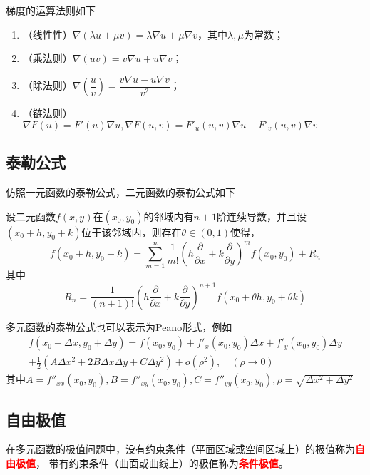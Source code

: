 梯度的运算法则如下
\begin{enumerate}[(1)]
    \item （线性性）$\nabla (\lambda u + \mu v) = \lambda \nabla u + \mu \nabla v$，其中$\lambda,\mu$为常数；
    \item （乘法则）$\nabla(uv) = v\nabla u + u\nabla v$；
    \item （除法则）$\nabla\left(\dfrac{u}{v}\right) = \dfrac{v\nabla u - u\nabla v}{v^2}$；
    \item （链法则）$\nabla F(u) = F'(u)\nabla u, \nabla F(u,v) = F'_u(u,v)\nabla u + F'_v(u,v)\nabla v$
\end{enumerate}

\subsection{泰勒公式}
仿照一元函数的泰勒公式，二元函数的泰勒公式如下
\begin{theorem}
    设二元函数$f(x,y)$在$(x_0,y_0)$的邻域内有$n+1$阶连续导数，并且设$(x_0+h,y_0+k)$位于该邻域内，则存在$\theta\in(0,1)$使得，
    \[
        f(x_0+h,y_0+k) = \sum_{m=1}^n \frac{1}{m!}\left(h\frac{\partial}{\partial x} + k\frac{\partial}{\partial y}\right)^mf(x_0,y_0) + R_n
    \]
    其中
    \[
        R_n = \frac{1}{(n+1)!}\left(h\frac{\partial}{\partial x}+k\frac{\partial}{\partial y}\right)^{n+1}f(x_0+\theta h,y_0 +\theta k)
    \]

    多元函数的泰勒公式也可以表示为Peano形式，例如
    \begin{equation}
        \begin{split}
            f(x_0+\Delta x, y_0 + \Delta y) = f(x_0,y_0) + f'_x(x_0,y_0)\Delta x + f'_y(x_0,y_0)\Delta y \\
            + \frac{1}{2}\left(A\Delta x^2 + 2B\Delta x\Delta y + C\Delta y^2\right) + o(\rho^2),\quad (\rho\to 0)
        \end{split}
    \end{equation}
    其中$A=f''_{xx}(x_0,y_0),B=f''_{xy}(x_0,y_0),C=f''_{yy}(x_0,y_0),\rho=\sqrt{\Delta x^2 + \Delta y^2}$
\end{theorem}

\subsection{自由极值}
在多元函数的极值问题中，没有约束条件（平面区域或空间区域上）的极值称为\textcolor{red}{\textbf{\textsf{自由极值}}}，
带有约束条件（曲面或曲线上）的极值称为\textcolor{red}{\textbf{\textsf{条件极值}}}。

